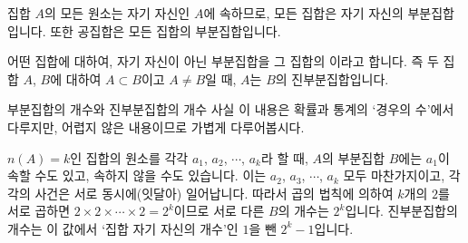 집합 $A$의 모든 원소는 자기 자신인 $A$에 속하므로, 모든 집합은 자기 자신의 부분집합입니다. 또한 공집합은 모든 집합의 부분집합입니다.

어떤 집합에 대하여, 자기 자신이 아닌 부분집합을 그 집합의 이라고 합니다. 즉 두 집합 $A$, $B$에 대하여 $A \subset B$이고 $A \neq B$일 때, $A$는 $B$의 진부분집합입니다.

\begin{remark}{부분집합의 개수와 진부분집합의 개수}
사실 이 내용은 확률과 통계의 `경우의 수'에서 다루지만, 어렵지 않은 내용이므로 가볍게 다루어봅시다.

$n\left( A \right) = k $인 집합의 원소를 각각 $a_1$, $a_2$, $\cdots$, $a_k$라 할 때, $A$의 부분집합 $B$에는 $a_1$이 속할 수도 있고, 속하지 않을 수도 있습니다. 이는 $a_2$, $a_3$, $\cdots$, $a_k$ 모두 마찬가지이고, 각각의 사건은 서로 동시에(잇달아) 일어납니다. 따라서 곱의 법칙에 의하여 $k$개의 $2$를 서로 곱하면 $2\times2\times\cdots\times2=2^k$이므로 서로 다른 $B$의 개수는 $2^k$입니다. 진부분집합의 개수는 이 값에서 `집합 자기 자신의 개수'인 $1$을 뺀 $2^k -1$입니다.
\end{remark}
\vskip-20pt
